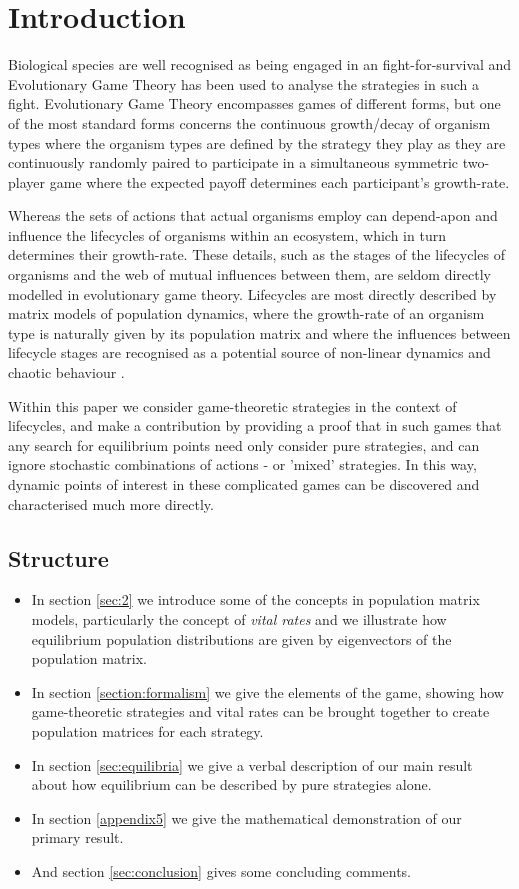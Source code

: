 
\section{Introduction}
Biological species are well recognised as being engaged in an fight-for-survival and Evolutionary Game Theory has been used to analyse the strategies in such a fight.
Evolutionary Game Theory encompasses games of different forms, but one of the most standard forms concerns the continuous growth/decay of organism types where the organism types are defined by the strategy they play as they are continuously randomly paired to participate in a simultaneous symmetric two-player game where the expected payoff determines each participant's growth-rate.\cite{maynard,maynard2,weibull}

Whereas the sets of actions that actual organisms employ can depend-apon and influence the lifecycles of organisms within an ecosystem, which in turn determines their growth-rate.
These details, such as the stages of the lifecycles of organisms and the web of mutual influences between them, are seldom directly modelled in evolutionary game theory.
Lifecycles are most directly described by matrix models of population dynamics, where the growth-rate of an organism type is naturally given by its population matrix and where the influences between lifecycle stages are recognised as a potential source of non-linear dynamics and chaotic behaviour \cite{doi:10.1080/10236198.2019.1699916, DEVRIES2020108875, population1}.

Within this paper we consider game-theoretic strategies in the context of lifecycles, and make a contribution by providing a proof that in such games that any search for equilibrium points need only consider pure strategies, and can ignore stochastic combinations of actions - or 'mixed' strategies.
In this way, dynamic points of interest in these complicated games can be discovered and characterised much more directly.

\subsection{Structure}
\begin{itemize}
\item In section \ref{sec:2} we introduce some of the concepts in population matrix models, particularly the concept of \textit{vital rates} and we illustrate how equilibrium population distributions are given by eigenvectors of the population matrix.
\item In section \ref{section:formalism} we give the elements of the game, showing how game-theoretic strategies and vital rates can be brought together to create population matrices for each strategy.
\item In section \ref{sec:equilibria} we give a verbal description of our main result about how equilibrium can be described by pure strategies alone.
\item In section \ref{appendix5} we give the mathematical demonstration of our primary result.
\item And section \ref{sec:conclusion} gives some concluding comments.
\end{itemize}


